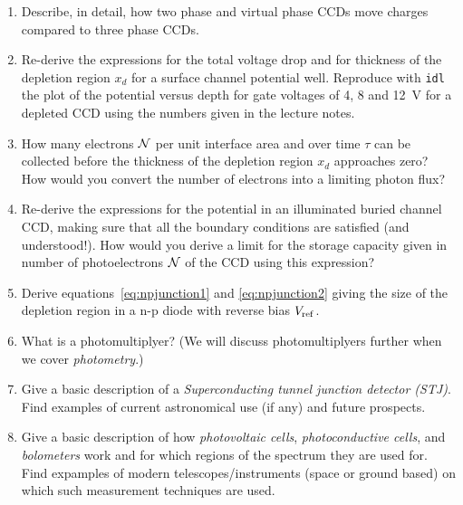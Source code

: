 \begin{enumerate}
\item Describe, in detail, how two phase and virtual phase CCDs move charges
compared to three phase CCDs.
\item Re-derive the expressions for the total voltage drop and for thickness 
of the depletion region $x_d$ for a surface channel potential well. Reproduce
with {\tt idl} the plot of the potential versus depth for gate voltages of 
4, 8 and 12~V for a depleted CCD using the numbers given in the lecture notes.
\item How many electrons $\cal{N}$ per unit interface area and over time $\tau$
can be collected before the thickness of the depletion region $x_d$ 
approaches zero? How would you convert the number of electrons into a limiting
photon flux?
\item Re-derive the expressions for the potential in an illuminated buried
channel CCD, making sure that all the boundary conditions are satisfied (and 
understood!). How would you derive a limit for the storage capacity given 
in number of photoelectrons $\cal{N}$ of the CCD using this
expression?
\item Derive equations~\ref{eq:npjunction1} and \ref{eq:npjunction2}
  giving the size of the depletion region in a n-p diode with reverse
  bias $V_{\rm ref}$.
\item What is a photomultiplyer? (We will discuss photomultiplyers
  further when we cover {\it photometry}.)
\item Give a basic description of a {\it Superconducting tunnel
    junction detector (STJ)}. Find examples of current
  astronomical use (if any) and future prospects.
\item Give a basic description of how {\it photovoltaic cells}, 
{\it photoconductive cells}, and {\it bolometers} work and for which regions
of the spectrum they are used for. Find expamples of modern telescopes/instruments
(space or ground based) on which such measurement techniques are used.
\end{enumerate}

%

